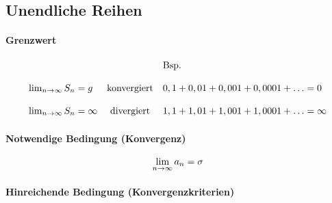 \subsection{Unendliche Reihen}

\paragraph{Grenzwert}

\[
    \begin{array}{lcl}
        & & \text{Bsp.} \\
        \\
        \lim_{n \rightarrow \infty} S_n = g & \text{konvergiert} & 0,1 + 0,01 + 0,001 + 0,0001 + \ldots = 0 \\
        \\
        \lim_{n \rightarrow \infty} S_n = \infty & \text{divergiert} & 1,1 + 1,01 + 1,001 + 1,0001 + \ldots = \infty
    \end{array}
\]

\paragraph{Notwendige Bedingung (Konvergenz)}

\[
    \lim_{n \rightarrow \infty} a_n = \sigma    
\]

\paragraph{Hinreichende Bedingung (Konvergenzkriterien)}




